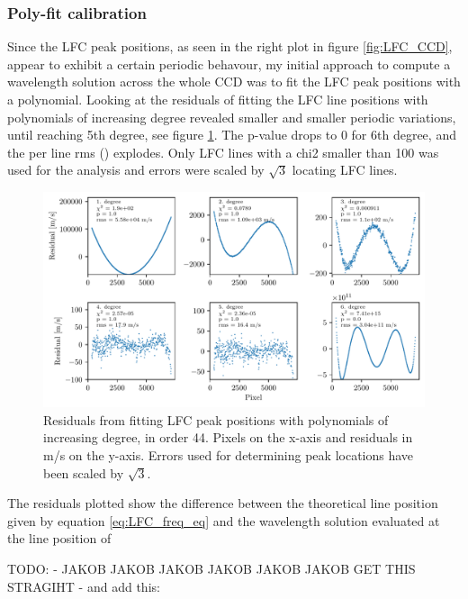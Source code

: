     \subsubsection{Poly-fit calibration}
    Since the LFC peak positions, as seen in the right plot in figure \ref{fig:LFC_CCD}, appear to exhibit a certain periodic behavour, my initial approach to compute a wavelength solution across the whole CCD was to fit the LFC peak positions with a polynomial. Looking at the residuals of fitting the LFC line positions with polynomials of increasing degree revealed smaller and smaller periodic variations, until reaching 5th degree, see figure \ref{fig:LFC_calib_poly_degrees}. The p-value drops to 0 for 6th degree, and the per line rms () explodes. Only LFC lines with a chi2 smaller than 100 was used for the analysis and errors were scaled by $\sqrt{3}$ locating LFC lines.

    \begin{figure}%
        \begin{wide}  
            \includegraphics[width=\textwidth]{figures/calib/calib_poly_fit_degrees_order44_residuals_ang.pdf}
            \caption{Residuals from fitting LFC peak positions with polynomials of increasing degree, in order 44. Pixels on the x-axis and residuals in m/s on the y-axis. Errors used for determining peak locations have been scaled by $\sqrt{3}$.}
            \label{fig:LFC_calib_poly_degrees}
        \end{wide}
    \end{figure}

    The residuals plotted show the difference between the theoretical line position given by equation \ref{eq:LFC_freq_eq} and the wavelength solution evaluated at the line position of 

    TODO:
    - JAKOB JAKOB JAKOB JAKOB JAKOB JAKOB GET THIS STRAGIHT 
    - and add this: 

